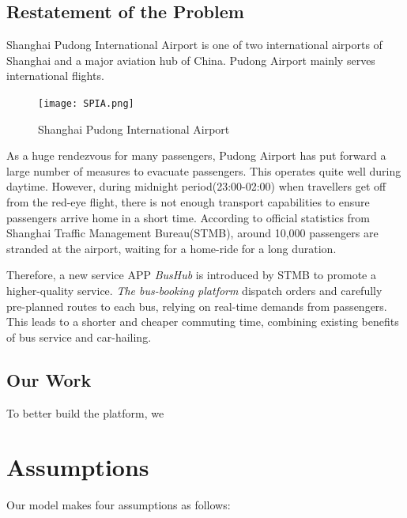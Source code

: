 \documentclass{mcmthesis}
\begin{document}
\subsection{Restatement of the Problem}
Shanghai Pudong International Airport is one of two international airports of Shanghai and a major aviation hub of China. Pudong Airport mainly serves international flights.

\begin{figure}[h]
    \centering
    \texttt{[image: SPIA.png]}
    \caption{Shanghai Pudong International Airport \cite{Google_SPIA}}
    \label{fig:SPIA}
\end{figure}

As a huge rendezvous for many passengers, Pudong Airport has put forward a large number of measures to evacuate passengers. This operates quite well during daytime. However, during midnight period(23:00-02:00) when travellers get off from the red-eye flight, there is not enough transport capabilities to ensure passengers arrive home in a short time. According to official statistics from Shanghai Traffic Management Bureau(STMB), around 10,000 passengers are stranded at the airport, waiting for a home-ride for a long duration.

Therefore, a new service APP \emph{BusHub} is introduced by STMB to promote a higher-quality service. \emph{The bus-booking platform} dispatch orders and carefully pre-planned routes to each bus, relying on real-time demands from passengers. This leads to a shorter and cheaper commuting time, combining existing benefits of bus service and car-hailing.

\subsection{Our Work}
To better build the platform, we 



\section{Assumptions}

Our model makes four assumptions as follows:
\end{document}
